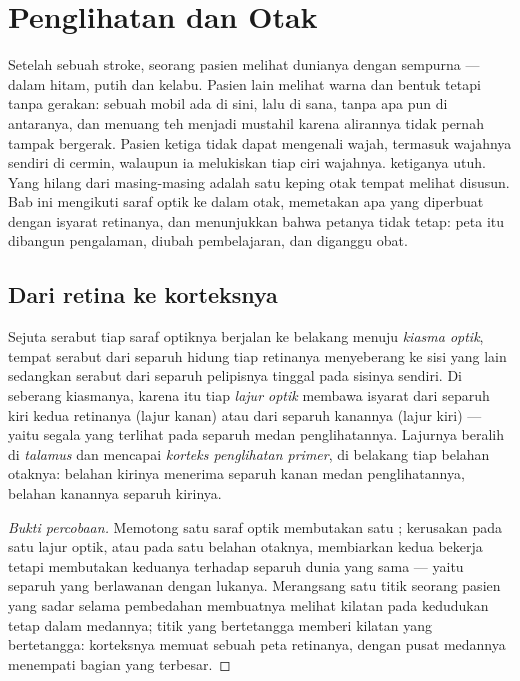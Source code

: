\chapter{Penglihatan dan Otak}\label{ch:g11:vision-and-brain}

Setelah sebuah stroke, seorang pasien melihat dunianya dengan sempurna
--- dalam hitam, putih dan kelabu. Pasien lain melihat warna dan bentuk
tetapi tanpa gerakan: sebuah mobil ada di sini, lalu di sana, tanpa apa
pun di antaranya, dan menuang teh menjadi mustahil karena
alirannya tidak pernah tampak bergerak. Pasien ketiga tidak dapat
mengenali wajah, termasuk wajahnya sendiri di cermin, walaupun ia
melukiskan tiap ciri wajahnya.  ketiganya utuh. Yang hilang dari
masing-masing adalah satu keping otak tempat melihat disusun. Bab ini
mengikuti saraf optik ke dalam otak, memetakan apa yang diperbuat
 dengan isyarat retinanya, dan menunjukkan bahwa
petanya tidak tetap: peta itu dibangun pengalaman, diubah pembelajaran,
dan diganggu obat.

\section{Dari retina ke korteksnya}

\begin{proposition}\label{prop:g11:vision-and-brain:pathway}
Sejuta serabut tiap saraf optiknya berjalan ke belakang menuju
\emph{kiasma optik}, tempat serabut dari separuh hidung tiap retinanya
menyeberang ke sisi yang lain sedangkan serabut dari separuh pelipisnya
tinggal pada sisinya sendiri. Di seberang kiasmanya, karena itu tiap
\emph{lajur optik} membawa isyarat dari separuh kiri kedua retinanya
(lajur kanan) atau dari separuh kanannya (lajur kiri) --- yaitu segala yang terlihat
pada separuh medan penglihatannya. Lajurnya beralih di \emph{talamus}
dan mencapai \emph{korteks penglihatan primer}, di belakang tiap belahan otaknya: belahan kirinya
menerima separuh kanan medan penglihatannya, belahan kanannya separuh
kirinya.
\end{proposition}
\begin{proof}[Bukti percobaan]
Memotong satu saraf optik membutakan satu ; kerusakan pada satu
lajur optik, atau pada  satu belahan otaknya,
membiarkan kedua  bekerja tetapi membutakan keduanya terhadap
separuh dunia yang sama --- yaitu separuh yang berlawanan dengan
lukanya. Merangsang satu titik  seorang pasien yang
sadar selama pembedahan membuatnya melihat kilatan pada kedudukan tetap
dalam medannya; titik yang bertetangga memberi kilatan yang
bertetangga: korteksnya memuat sebuah peta retinanya, dengan pusat
medannya menempati bagian yang terbesar.
\end{proof}

